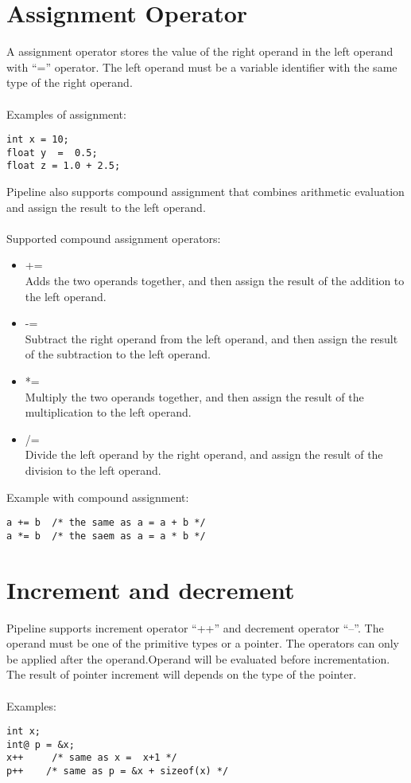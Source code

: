 \documentclass[./LRM_main.tex]{subfiles}
\begin{document}
\section{Assignment Operator}
A assignment operator stores the value of the right operand in the left operand with “=” operator. The left operand must be a variable identifier with the same type of the right operand.\\
\vspace{1 mm}\\
Examples of assignment:
\begin{lstlisting}
int x = 10; 
float y  =  0.5;  
float z = 1.0 + 2.5;
\end{lstlisting}	
Pipeline also supports compound assignment that combines arithmetic evaluation and assign the result to the left operand. \\
\pagebreak\\
Supported compound assignment operators: \\
\begin{itemize}
\item +=\\
Adds the two operands together, and then assign the result of the addition to the left operand.\\
\item -=\\
Subtract the right operand from the left operand, and then assign the result of the subtraction to the left operand.\\
\item *=\\
Multiply the two operands together, and then assign the result of the multiplication to the left operand.\\
\item /=\\
Divide the left operand by the right operand, and assign the result of the division to the left operand.\\
\end{itemize}
Example with compound assignment:
\begin{lstlisting}
a += b  /* the same as a = a + b */
a *= b  /* the saem as a = a * b */
\end{lstlisting}
\section{Increment and decrement}
Pipeline supports increment operator “++” and  decrement operator “--”. The operand must be one of the primitive types or a pointer. The operators can only be applied after the operand.Operand will be evaluated before incrementation.\\
The result of pointer increment will depends on the type of the pointer.\\
\vspace{1 mm}\\
Examples:
\begin{lstlisting}
int x;
int@ p = &x;
x++     /* same as x =  x+1 */
p++    /* same as p = &x + sizeof(x) */ 
\end{lstlisting}
\end{document}
